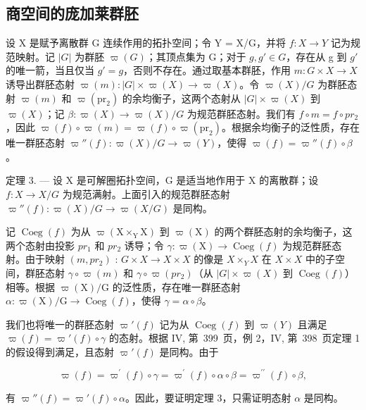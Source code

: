 \subsection{商空间的庞加莱群胚}

设 X 是赋予离散群 G 连续作用的拓扑空间；令 Y = X/G，并将 \(f: X \to Y\) 记为规范映射。记 \(\lvert G\rvert\) 为群胚 \(\varpi(G)\)；其顶点集为 G；对于 \(g, g' \in G\)，存在从 g 到 \(g'\) 的唯一箭，当且仅当 \(g' = g\)，否则不存在。通过取基本群胚，作用 \(m: G \times X \to X\) 诱导出群胚态射 \(\varpi(m): \lvert G\rvert \times \varpi(X) \to \varpi(X)\)。令 \(\varpi(X)/G\) 为群胚态射 \(\varpi(m)\) 和 \(\varpi(\mathrm{pr}_{2})\) 的余均衡子，这两个态射从 \(\lvert G\rvert \times \varpi(X)\) 到 \(\varpi(X)\)；记 \(\beta: \varpi(X) \to \varpi(X)/G\) 为规范群胚态射。我们有 \(f \circ m = f \circ pr_{2}\)，因此 \(\varpi(f) \circ \varpi(m) = \varpi(f) \circ \varpi(\mathrm{pr}_{2})\)。根据余均衡子的泛性质，存在唯一群胚态射 \(\varpi''(f): \varpi(X)/G \to \varpi(Y)\)，使得 \(\varpi(f) = \varpi''(f) \circ \beta\)。

定理 3. --- 设 X 是可解圈拓扑空间，G 是适当地作用于 X 的离散群；设 \(f\colon X \to X/G\) 为规范满射。上面引入的规范群胚态射 \(\varpi''(f)\colon \varpi(X)/G \to \varpi(X/G)\) 是同构。

记 \(\operatorname{Coeg}(f)\) 为从 \(\varpi(\mathrm{X} \times_{\mathrm{Y}} \mathrm{X})\) 到 \(\varpi(\mathrm{X})\) 的两个群胚态射的余均衡子，这两个态射由投影 \(pr_{1}\) 和 \(pr_{2}\) 诱导；令 \(\gamma: \varpi(\mathrm{X}) \to \operatorname{Coeg}(f)\) 为规范群胚态射。由于映射 \((m, pr_{2})\) : \(G \times X \to X \times X\) 的像是 \(X \times_{Y} X\) 在 \(X \times X\) 中的子空间，群胚态射 \(\gamma \circ \varpi(m)\) 和 \(\gamma \circ \varpi(pr_{2})\)（从 \(\lvert G\rvert \times \varpi(X)\) 到 \(\operatorname{Coeg}(f)\)）相等。根据 \(\varpi(\mathrm{X})/\mathrm{G}\) 的泛性质，存在唯一群胚态射 \(\alpha: \varpi(\mathrm{X})/\mathrm{G} \to \operatorname{Coeg}(f)\)，使得 \(\gamma = \alpha \circ \beta\)。

我们也将唯一的群胚态射 \(\varpi'(f)\) 记为从 \(\operatorname{Coeg}(f)\) 到 \(\varpi(Y)\) 且满足 \(\varpi(f) = \varpi'(f) \circ \gamma\) 的态射。根据 IV, 第~399~页，例 2，IV, 第~398~页定理 1 的假设得到满足，且态射 \(\varpi'(f)\) 是同构。由于

\[
\varpi (f) = \varpi^ {\prime} (f) \circ \gamma = \varpi^ {\prime} (f) \circ \alpha \circ \beta = \varpi^ {\prime \prime} (f) \circ \beta ,
\]

有 \(\varpi''(f) = \varpi'(f) \circ \alpha\)。因此，要证明定理 3，只需证明态射 \(\alpha\) 是同构。

